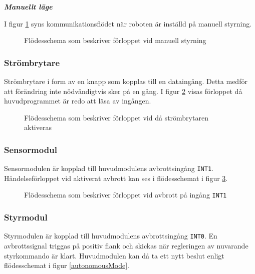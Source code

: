 \documentclass[11pt]{article}
\begin{document}
\begin{flushleft}
\textbf{\textit{Manuellt läge}}

I figur \ref{manualMode} syns kommunikationsflödet när roboten är inställd på manuell styrning.

\begin{figure}[htbp]
\centering
\noindent\resizebox{0.9\linewidth}{!}{
	}
	\cprotect\caption{Flödesschema som beskriver förloppet vid manuell styrning \label{manualMode}}	
\end{figure}

\subsubsection {Strömbrytare}
Strömbrytare i form av en knapp som kopplas till en dataingång. Detta medför att förändring inte nödvändigtvis sker på en gång. I figur \ref{strombrytare} visas förloppet då huvudprogrammet är redo att läsa av ingången. 

\begin{figure}[htbp]
\centering
\noindent\resizebox{.6\linewidth}{!}{
	}
	\cprotect\caption{Flödesschema som beskriver förloppet vid då strömbrytaren aktiveras \label{strombrytare}}	
\end{figure}

\subsubsection {Sensormodul} 
Sensormodulen är kopplad till huvudmodulens avbrottsingång \verb+INT1+. Händelseförloppet vid aktiverat avbrott kan ses i flödesschemat i figur \ref{avbrott_sensormodul}.

\begin{figure}[htbp]
\centering
\noindent\resizebox{1\linewidth}{!}{
	}
	\cprotect\caption{Flödesschema som beskriver förloppet vid avbrott på ingång \verb+INT1+ \label{avbrott_sensormodul}}	
\end{figure}

\subsubsection{Styrmodul}
\label{styrModul}
Styrmodulen är kopplad till huvudmodulens avbrottsingång  \verb+INT0+. En avbrottssignal triggas på positiv flank och skickas när regleringen av nuvarande styrkommando är klart. Huvudmodulen kan då ta ett nytt beslut enligt flödesschemat i figur \ref{autonomousMode}.


\end{flushleft}
\end{document}
